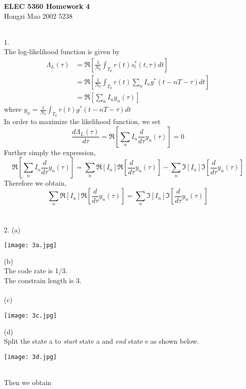 \documentclass [12pt] {article}
\begin{document}
\begin{spacing}{1.5}
\begin{center}
\small
\textbf{ELEC 5360 Homework 4}\\ Hongzi Mao 2002 5238\\
\end{center}
\normalsize
~\\
1. \\
The log-likelihood function is given by 
\begin{align*}
 \Lambda _L (\tau) &= \Re[\frac{1}{N_0} \int_{T_0} r(t) s_l^*(t,\tau) dt]\\
&=\Re[\frac{1}{N_0} \int_{T_0} r(t) \sum_{n} I_n g^*(t - nT -\tau) dt]\\
&=\Re[\sum_n I_n y_n(\tau)]
 \end{align*}
 where $ y_n = \frac{1}{N_0} \int_{T_0} r(t)g^*(t - nT -\tau) dt$\\
 In order to maximize the likelihood function, we set $$ \frac{d \Lambda _L (\tau)}{d\tau} = \Re[\sum_n I_n \frac{d}{d\tau}y_n(\tau)] = 0$$
 Further simply the expression, $$\Re[ \sum_n I_n \frac{d}{d\tau}y_n(\tau)] = \sum_n\Re[I_n]\Re[\frac{d}{d\tau}y_n(\tau)] - \sum_n\Im[I_n]\Im[\frac{d}{d\tau}y_n(\tau)]$$
 Therefore we obtain, $$ \sum_n\Re[I_n]\Re[\frac{d}{d\tau}y_n(\tau)] = \sum_n\Im[I_n]\Im[\frac{d}{d\tau}y_n(\tau)]$$
~\\
\pagebreak
~\\
2. (a) \\
\begin{center}
\texttt{[image: 3a.jpg]}\\
\end{center}
(b) \\
The code rate is 1/3. \\
The constrain length is 3. \\
~\\
(c)\\
\begin{center}
\texttt{[image: 3c.jpg]}\\
\end{center}
(d)\\
Split the state a to \emph{start} state a and \emph{end} state e as shown below. \\
\begin{center}
\texttt{[image: 3d.jpg]}\\
\end{center}
~\\
Then we obtain
\begin{align*}

\end{align*}
\end{spacing}
\end{document}
